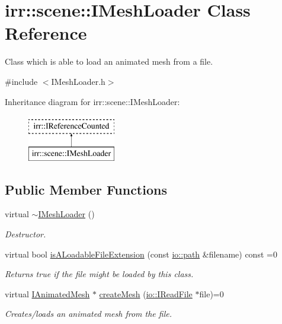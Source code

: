 \hypertarget{classirr_1_1scene_1_1IMeshLoader}{}\section{irr\+:\+:scene\+:\+:I\+Mesh\+Loader Class Reference}
\label{classirr_1_1scene_1_1IMeshLoader}


Class which is able to load an animated mesh from a file.  




{\ttfamily \#include $<$I\+Mesh\+Loader.\+h$>$}

Inheritance diagram for irr\+:\+:scene\+:\+:I\+Mesh\+Loader\+:\begin{figure}[H]
\begin{center}
\leavevmode
\includegraphics[height=2.000000cm]{classirr_1_1scene_1_1IMeshLoader}
\end{center}
\end{figure}
\subsection*{Public Member Functions}
\begin{DoxyCompactItemize}
\item 
\mbox{\label{classirr_1_1scene_1_1IMeshLoader_ad20920b323a9902d50e8d09211730d4d}} 
virtual \hyperlink{classirr_1_1scene_1_1IMeshLoader_ad20920b323a9902d50e8d09211730d4d}{$\sim$\+I\+Mesh\+Loader} ()
\begin{DoxyCompactList}\small\item\em Destructor. \end{DoxyCompactList}\item 
virtual bool \hyperlink{classirr_1_1scene_1_1IMeshLoader_a64bd3f1f17b4ff1f0f4f929c850614f3}{is\+A\+Loadable\+File\+Extension} (const \hyperlink{namespaceirr_1_1io_ab1bdc45edb3f94d8319c02bc0f840ee1}{io\+::path} \&filename) const =0
\begin{DoxyCompactList}\small\item\em Returns true if the file might be loaded by this class. \end{DoxyCompactList}\item 
virtual \hyperlink{classirr_1_1scene_1_1IAnimatedMesh}{I\+Animated\+Mesh} $\ast$ \hyperlink{classirr_1_1scene_1_1IMeshLoader_ad09c19dd8c8608f0e49c40102e2aaee1}{create\+Mesh} (\hyperlink{classirr_1_1io_1_1IReadFile}{io\+::\+I\+Read\+File} $\ast$file)=0
\begin{DoxyCompactList}\small\item\em Creates/loads an animated mesh from the file. \end{DoxyCompactList}\end{DoxyCompactItemize}

